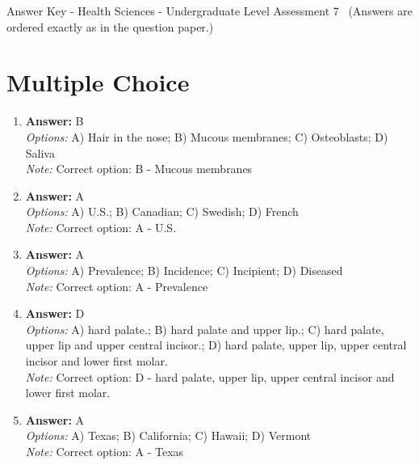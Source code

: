 \documentclass[12pt]{article}
\begin{document}
\begin{center}
Answer Key - Health Sciences - Undergraduate Level Assessment 7 \
\small (Answers are ordered exactly as in the question paper.)
\end{center}

\section*{Multiple Choice}
\begin{enumerate}[label=\arabic*.]
\item \textbf{Answer:} B
\\ \textit{Options:} A) Hair in the nose; B) Mucous membranes; C) Osteoblasts; D) Saliva
\\ \textit{Note:} Correct option: B - Mucous membranes
\item \textbf{Answer:} A
\\ \textit{Options:} A) U.S.; B) Canadian; C) Swedish; D) French
\\ \textit{Note:} Correct option: A - U.S.
\item \textbf{Answer:} A
\\ \textit{Options:} A) Prevalence; B) Incidence; C) Incipient; D) Diseased
\\ \textit{Note:} Correct option: A - Prevalence
\item \textbf{Answer:} D
\\ \textit{Options:} A) hard palate.; B) hard palate and upper lip.; C) hard palate, upper lip and upper central incisor.; D) hard palate, upper lip, upper central incisor and lower first molar.
\\ \textit{Note:} Correct option: D - hard palate, upper lip, upper central incisor and lower first molar.
\item \textbf{Answer:} A
\\ \textit{Options:} A) Texas; B) California; C) Hawaii; D) Vermont
\\ \textit{Note:} Correct option: A - Texas
\end{enumerate}
\end{document}
